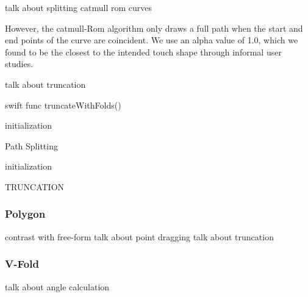 talk about splitting catmull rom curves

However, the catmull-Rom algorithm only draws a full path when the start
and end points of the curve are coincident. We use an alpha value of
1.0, which we found to be the closest to the intended touch shape
through informal user studies.

talk about truncation

\small
\singlespacing 

\begin{pygmented}{swift}
func truncateWithFolds()
\end{pygmented}

\doublespacing
\normalsize

\begin{algorithm}[H]
 initialization\;
 \caption{Path Splitting}
\end{algorithm}

\begin{algorithm}[H]
 initialization\;
 \caption{TRUNCATION}
\end{algorithm}

\subsubsection{Polygon}\label{polygon}

contrast with free-form talk about point dragging talk about truncation

\subsubsection{V-Fold}\label{v-fold}

talk about angle calculation

